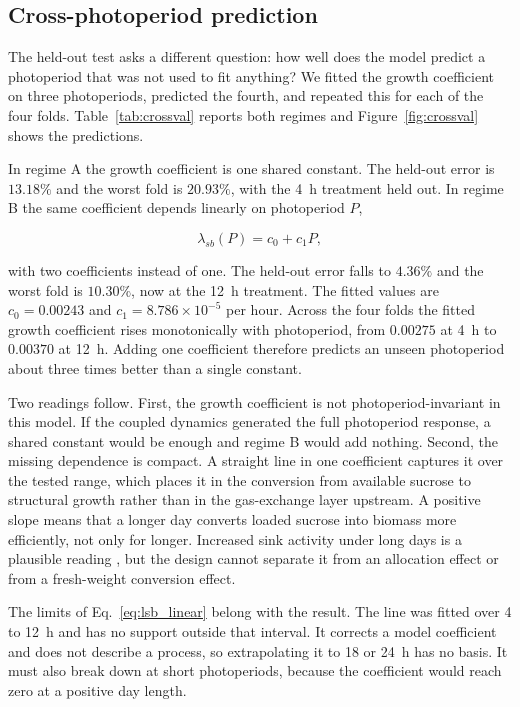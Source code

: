 \subsection{Cross-photoperiod prediction}
\label{sec:results:crossval}

The held-out test asks a different question: how well does the model predict a
photoperiod that was not used to fit anything? We fitted the growth coefficient
on three photoperiods, predicted the fourth, and repeated this for each of the
four folds. Table~\ref{tab:crossval} reports both regimes and
Figure~\ref{fig:crossval} shows the predictions.

In regime A the growth coefficient is one shared constant. The held-out error is
$13.18\%$ and the worst fold is $20.93\%$, with the 4~h treatment held out. In
regime B the same coefficient depends linearly on photoperiod $P$,

\begin{equation}
\lambda_{sb}(P) = c_0 + c_1 P,
\label{eq:lsb_linear}
\end{equation}

with two coefficients instead of one. The held-out error falls to $4.36\%$ and
the worst fold is $10.30\%$, now at the 12~h treatment. The fitted values are
$c_0 = 0.00243$ and $c_1 = 8.786\times10^{-5}$ per hour. Across the four folds
the fitted growth coefficient rises monotonically with photoperiod, from
$0.00275$ at 4~h to $0.00370$ at 12~h. Adding one coefficient therefore
predicts an unseen photoperiod about three times better than a single
constant.

Two readings follow. First, the growth coefficient is not photoperiod-invariant
in this model. If the coupled dynamics generated the full photoperiod response,
a shared constant would be enough and regime B would add nothing. Second, the
missing dependence is compact. A straight line in one coefficient captures it
over the tested range, which places it in the conversion from available sucrose
to structural growth rather than in the gas-exchange layer upstream. A positive
slope means that a longer day converts loaded sucrose into biomass more
efficiently, not only for longer. Increased sink activity under long days is a
plausible reading \citep{Smith2007,Sulpice2014}, but the design cannot separate
it from an allocation effect or from a fresh-weight conversion effect.

The limits of Eq.~\ref{eq:lsb_linear} belong with the result. The line was
fitted over 4 to 12~h and has no support outside that interval. It corrects a
model coefficient and does not describe a process, so extrapolating it to 18 or
24~h has no basis. It must also break down at short photoperiods, because the
coefficient would reach zero at a positive day length.

